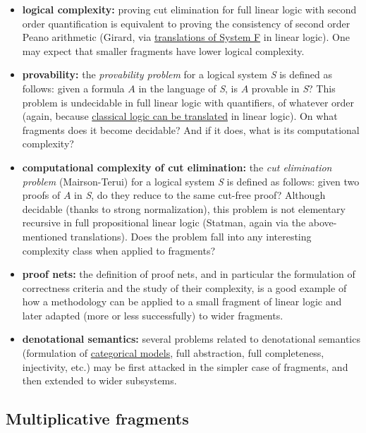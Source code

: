\begin{itemize}
\tightlist
\item
  \textbf{logical complexity:} proving cut elimination for full linear
  logic with second order quantification is equivalent to proving the
  consistency of second order Peano arithmetic (Girard, via
  \href{Translations_of_intuitionistic_logic}{translations of System F}
  in linear logic). One may expect that smaller fragments have lower
  logical complexity.
\item
  \textbf{provability:} the \emph{provability problem} for a logical
  system \emph{S} is defined as follows: given a formula \(A\) in the
  language of \emph{S}, is \(A\) provable in \emph{S}? This problem is
  undecidable in full linear logic with quantifiers, of whatever order
  (again, because \href{Translations_of_classical_logic}{classical logic
  can be translated} in linear logic). On what fragments does it become
  decidable? And if it does, what is its computational complexity?
\item
  \textbf{computational complexity of cut elimination:} the \emph{cut
  elimination problem} (Mairson-Terui) for a logical system \emph{S} is
  defined as follows: given two proofs of \(A\) in \emph{S}, do they
  reduce to the same cut-free proof? Although decidable (thanks to
  strong normalization), this problem is not elementary recursive in
  full propositional linear logic (Statman, again via the
  above-mentioned translations). Does the problem fall into any
  interesting complexity class when applied to fragments?
\item
  \textbf{proof nets:} the definition of proof nets, and in particular
  the formulation of correctness criteria and the study of their
  complexity, is a good example of how a methodology can be applied to a
  small fragment of linear logic and later adapted (more or less
  successfully) to wider fragments.
\item
  \textbf{denotational semantics:} several problems related to
  denotational semantics (formulation of
  \href{Categorical_semantics}{categorical models}, full abstraction,
  full completeness, injectivity, etc.) may be first attacked in the
  simpler case of fragments, and then extended to wider subsystems.
\end{itemize}

\subsection{Multiplicative fragments}\label{multiplicative-fragments}

